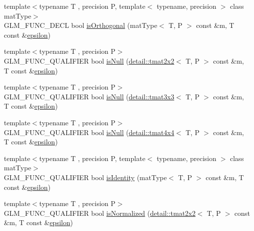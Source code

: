 \begin{DoxyCompactItemize}
\item 
{\footnotesize template$<$typename T , precision P, template$<$ typename, precision $>$ class mat\-Type$>$ }\\G\-L\-M\-\_\-\-F\-U\-N\-C\-\_\-\-D\-E\-C\-L bool \hyperlink{group__gtx__matrix__query_gab2cb5d23df77b4e4e63ad2965acd31b3}{is\-Orthogonal} (mat\-Type$<$ T, P $>$ const \&m, T const \&\hyperlink{group__gtc__constants_gacb41049b8d22c8aa90e362b96c524feb}{epsilon})
\item 
{\footnotesize template$<$typename T , precision P$>$ }\\G\-L\-M\-\_\-\-F\-U\-N\-C\-\_\-\-Q\-U\-A\-L\-I\-F\-I\-E\-R bool \hyperlink{group__gtx__matrix__query_gaf7e38680b67a3589a262d281660e4694}{is\-Null} (\hyperlink{structglm_1_1detail_1_1tmat2x2}{detail\-::tmat2x2}$<$ T, P $>$ const \&m, T const \&\hyperlink{group__gtc__constants_gacb41049b8d22c8aa90e362b96c524feb}{epsilon})
\item 
{\footnotesize template$<$typename T , precision P$>$ }\\G\-L\-M\-\_\-\-F\-U\-N\-C\-\_\-\-Q\-U\-A\-L\-I\-F\-I\-E\-R bool \hyperlink{group__gtx__matrix__query_ga7a6ef9f174fec0224214ff5ba6c27ba4}{is\-Null} (\hyperlink{structglm_1_1detail_1_1tmat3x3}{detail\-::tmat3x3}$<$ T, P $>$ const \&m, T const \&\hyperlink{group__gtc__constants_gacb41049b8d22c8aa90e362b96c524feb}{epsilon})
\item 
{\footnotesize template$<$typename T , precision P$>$ }\\G\-L\-M\-\_\-\-F\-U\-N\-C\-\_\-\-Q\-U\-A\-L\-I\-F\-I\-E\-R bool \hyperlink{group__gtx__matrix__query_ga5b8d7b0c7bf1d48ff8df10321440a61a}{is\-Null} (\hyperlink{structglm_1_1detail_1_1tmat4x4}{detail\-::tmat4x4}$<$ T, P $>$ const \&m, T const \&\hyperlink{group__gtc__constants_gacb41049b8d22c8aa90e362b96c524feb}{epsilon})
\item 
{\footnotesize template$<$typename T , precision P, template$<$ typename, precision $>$ class mat\-Type$>$ }\\G\-L\-M\-\_\-\-F\-U\-N\-C\-\_\-\-Q\-U\-A\-L\-I\-F\-I\-E\-R bool \hyperlink{group__gtx__matrix__query_gafc1ce12c738b8c5d007179e615609330}{is\-Identity} (mat\-Type$<$ T, P $>$ const \&m, T const \&\hyperlink{group__gtc__constants_gacb41049b8d22c8aa90e362b96c524feb}{epsilon})
\item 
{\footnotesize template$<$typename T , precision P$>$ }\\G\-L\-M\-\_\-\-F\-U\-N\-C\-\_\-\-Q\-U\-A\-L\-I\-F\-I\-E\-R bool \hyperlink{group__gtx__matrix__query_gaae7339fac94c86ed741f20b6915682ab}{is\-Normalized} (\hyperlink{structglm_1_1detail_1_1tmat2x2}{detail\-::tmat2x2}$<$ T, P $>$ const \&m, T const \&\hyperlink{group__gtc__constants_gacb41049b8d22c8aa90e362b96c524feb}{epsilon})

\end{DoxyCompactItemize}
